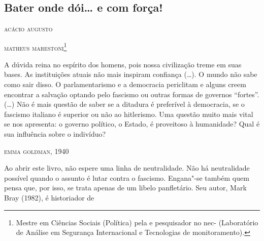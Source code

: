 \part{}

\chapter[Bater onde dói\ldots{} e com força!]{Bater onde dói\ldots{} e com força! }

\hfill{}\textsc{acácio augusto}

\hfill{}\textsc{matheus marestoni}\footnote[\dag]{Mestre em Ciências Sociais (Política) pela
   e pesquisador no nec- (Laboratório de Análise em
  Segurança Internacional e Tecnologias de monitoramento).}

\bigskip

\epigraph{A dúvida reina no espírito dos homens, pois nossa civilização
treme em suas bases.
As instituições atuais não mais inspiram confiança (\ldots{}). O mundo
não sabe como sair disso. O parlamentarismo e a democracia periclitam e
alguns creem encontrar a salvação optando pelo fascismo ou outras formas
de governos ``fortes''. (\ldots{}) Não é mais questão de saber se a ditadura
é preferível à democracia, se o fascismo italiano é superior ou não ao
hitlerismo. Uma questão muito mais vital se nos apresenta:
o governo político, o Estado, é proveitoso à humanidade?
Qual é sua influência sobre o indivíduo?}{\textsc{emma goldman}, 1940}

Ao abrir este livro, não espere uma linha de neutralidade. Não há
neutralidade possível quando o assunto é lutar contra o fascismo.
Engana"-se também quem pensa que, por isso, se trata 
apenas de um libelo
panfletário. Seu autor, Mark Bray (1982), é historiador de \linebreak

